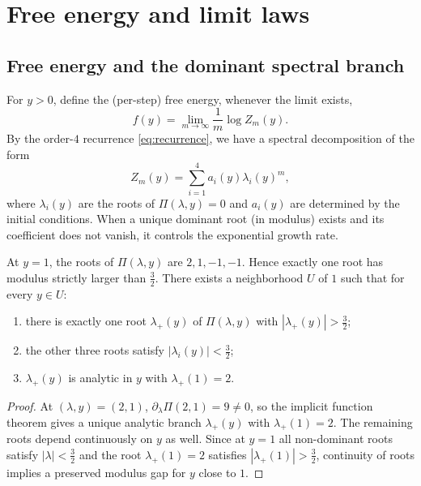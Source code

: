 \section{Free energy and limit laws}\label{sec:free}

\subsection{Free energy and the dominant spectral branch}

For $y>0$, define the (per-step) free energy, whenever the limit exists,
\begin{equation}\label{eq:free-energy}
f(y)=\lim_{m\to\infty}\frac{1}{m}\log Z_m(y).
\end{equation}
By the order-$4$ recurrence \eqref{eq:recurrence}, we have a spectral decomposition of the form
\[
Z_m(y)=\sum_{i=1}^4 a_i(y)\lambda_i(y)^m,
\]
where $\lambda_i(y)$ are the roots of $\Pi(\lambda,y)=0$ and $a_i(y)$ are determined by the initial conditions.
When a unique dominant root (in modulus) exists and its coefficient does not vanish, it controls the exponential growth rate.

\begin{lemma}[Dominant-root separation near $y=1$]\label{lem:dominant-root-separation}
At $y=1$, the roots of $\Pi(\lambda,y)$ are $2,1,-1,-1$.
Hence exactly one root has modulus strictly larger than $\frac{3}{2}$.
There exists a neighborhood $U$ of $1$ such that for every $y\in U$:
\begin{enumerate}
  \item there is exactly one root $\lambda_+(y)$ of $\Pi(\lambda,y)$ with $|\lambda_+(y)|>\frac32$;
  \item the other three roots satisfy $|\lambda_i(y)|<\frac32$;
  \item $\lambda_+(y)$ is analytic in $y$ with $\lambda_+(1)=2$.
\end{enumerate}
\end{lemma}

\begin{proof}
At $(\lambda,y)=(2,1)$, $\partial_\lambda\Pi(2,1)=9\neq0$, so the implicit function theorem gives a unique analytic branch $\lambda_+(y)$ with $\lambda_+(1)=2$.
The remaining roots depend continuously on $y$ as well.
Since at $y=1$ all non-dominant roots satisfy $|\lambda|<\frac32$ and the root $\lambda_+(1)=2$ satisfies $|\lambda_+(1)|>\frac32$, continuity of roots implies a preserved modulus gap for $y$ close to $1$.
\end{proof}

